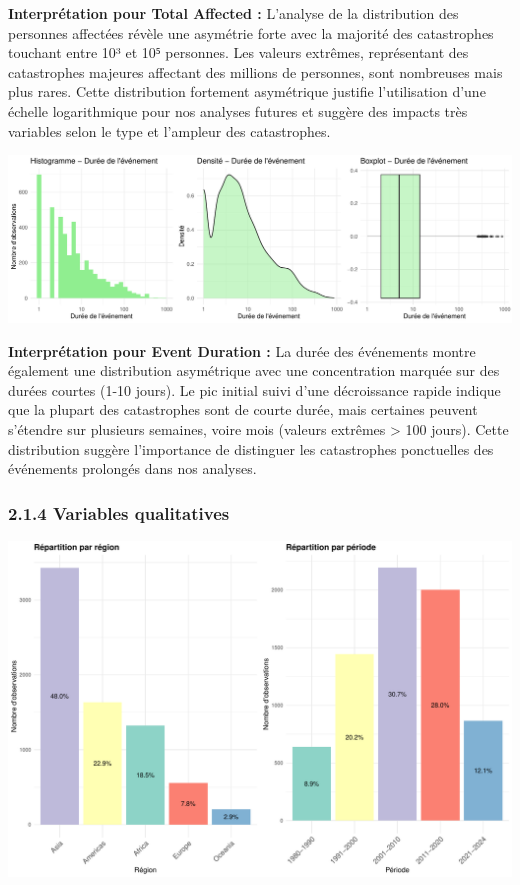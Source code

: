 \documentclass[
]{article}
\begin{document}
\textbf{Interprétation pour Total Affected :} L'analyse de la
distribution des personnes affectées révèle une asymétrie forte avec la
majorité des catastrophes touchant entre 10³ et 10⁵ personnes. Les
valeurs extrêmes, représentant des catastrophes majeures affectant des
millions de personnes, sont nombreuses mais plus rares. Cette
distribution fortement asymétrique justifie l'utilisation d'une échelle
logarithmique pour nos analyses futures et suggère des impacts très
variables selon le type et l'ampleur des catastrophes.

\includegraphics{Projet_ML_files/figure-latex/quantitative_vars 2-1.pdf}

\textbf{Interprétation pour Event Duration :} La durée des événements
montre également une distribution asymétrique avec une concentration
marquée sur des durées courtes (1-10 jours). Le pic initial suivi d'une
décroissance rapide indique que la plupart des catastrophes sont de
courte durée, mais certaines peuvent s'étendre sur plusieurs semaines,
voire mois (valeurs extrêmes \textgreater{} 100 jours). Cette
distribution suggère l'importance de distinguer les catastrophes
ponctuelles des événements prolongés dans nos analyses.

\subsubsection{2.1.4 Variables
qualitatives}\label{variables-qualitatives}

\begin{center}\includegraphics[width=1\linewidth]{Projet_ML_files/figure-latex/unnamed-chunk-2-1} \end{center}
\end{document}
